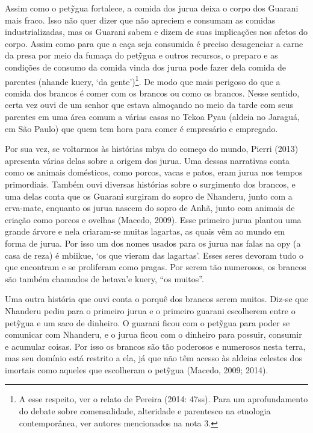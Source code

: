 Assim como o pet\~{y}gua fortalece, a comida dos jurua deixa o corpo dos
Guarani mais fraco. Isso não quer dizer que não apreciem e consumam as
comidas industrializadas, mas os Guarani sabem e dizem de suas
implicações nos afetos do corpo. Assim como para que a caça seja
consumida é preciso desagenciar a carne da presa por meio da fumaça do
pet\~{y}gua e outros recursos, o preparo e as condições de consumo da
comida vinda dos jurua pode fazer dela comida de parentes (nhande
kuery, ‘da gente’)\footnote{A esse respeito, ver o relato de Pereira
(2014: 47ss). Para um aprofundamento do debate sobre comensalidade,
alteridade e parentesco na etnologia contemporânea, ver autores
mencionados na nota 3.}. De modo que mais perigoso do que a comida dos
brancos é comer com os brancos ou como os brancos. Nesse sentido, certa
vez ouvi de um senhor que estava almoçando no meio da tarde com seus
parentes em uma área comum a várias casas no Tekoa Pyau (aldeia no
Jaraguá, em São Paulo) que quem tem hora para comer é empresário e
empregado.

Por sua vez, se voltarmos às histórias mbya do começo do mundo, Pierri
(2013) apresenta várias delas sobre a origem dos jurua. Uma dessas
narrativas conta como os animais domésticos, como porcos, vacas e
patos, eram jurua nos tempos primordiais. Também ouvi diversas
histórias sobre o surgimento dos brancos, e uma delas conta que os
Guarani surgiram do sopro de Nhanderu, junto com a erva-mate, enquanto
os jurua nascem do sopro de Anhã, junto com animais de criação como
porcos e ovelhas (Macedo, 2009). Esse primeiro jurua plantou uma grande
árvore e nela criaram-se muitas lagartas, as quais vêm ao mundo em
forma de jurua. Por isso um dos nomes usados para os jurua nas falas na
opy (a casa de reza) é mbiikue, ‘os que vieram das lagartas’. Esses
seres devoram tudo o que encontram e se proliferam como pragas. Por
serem tão numerosos, os brancos são também chamados de hetava’e kuery,
``os muitos''.

Uma outra história que ouvi conta o porquê dos brancos serem muitos.
Diz-se que Nhanderu pediu para o primeiro jurua e o primeiro guarani
escolherem entre o pet\~{y}gua e um saco de dinheiro. O guarani ficou
com o pet\~{y}gua para poder se comunicar com Nhanderu, e o jurua ficou
com o dinheiro para possuir, consumir e acumular coisas. Por isso os
brancos são tão poderosos e numerosos nesta terra, mas seu domínio está
restrito a ela, já que não têm acesso às aldeias celestes dos imortais
como aqueles que escolheram o pet\~{y}gua (Macedo, 2009; 2014). 

